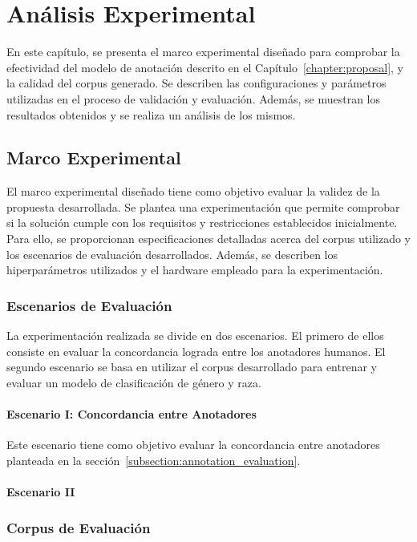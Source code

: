 \chapter{An\'alisis Experimental}\label{chapter:implementation}
En este cap\'itulo, se presenta el marco experimental dise\~nado para comprobar la efectividad del modelo de anotaci\'on 
descrito en el Cap\'itulo~\ref{chapter:proposal}, y la calidad del corpus generado. Se describen las configuraciones y 
par\'ametros utilizadas en el proceso de validaci\'on y evaluaci\'on. Adem\'as, se muestran los resultados obtenidos y 
se realiza un an\'alisis de los mismos.

\section{Marco Experimental}
El marco experimental dise\~nado tiene como objetivo evaluar la validez de la propuesta desarrollada. Se plantea 
una experimentaci\'on que permite comprobar si la soluci\'on cumple con los requisitos y restricciones establecidos inicialmente.
Para ello, se proporcionan especificaciones detalladas acerca del corpus utilizado y los escenarios de evaluaci\'on desarrollados.
Adem\'as, se describen los hiperpar\'ametros utilizados y el hardware empleado para la experimentaci\'on.

\subsection{Escenarios de Evaluaci\'on}
La experimentaci\'on realizada se divide en dos escenarios. El primero de ellos consiste en evaluar la concordancia lograda entre 
los anotadores humanos. El segundo escenario se basa en utilizar el corpus desarrollado para entrenar y evaluar un modelo de 
clasificaci\'on de g\'enero y raza. 

\subsubsection{Escenario I: Concordancia entre Anotadores}
Este escenario tiene como objetivo evaluar la concordancia entre anotadores planteada en la 
secci\'on~\ref{subsection:annotation_evaluation}. 

\subsubsection{Escenario II}
\subsection{Corpus de Evaluaci\'on}
